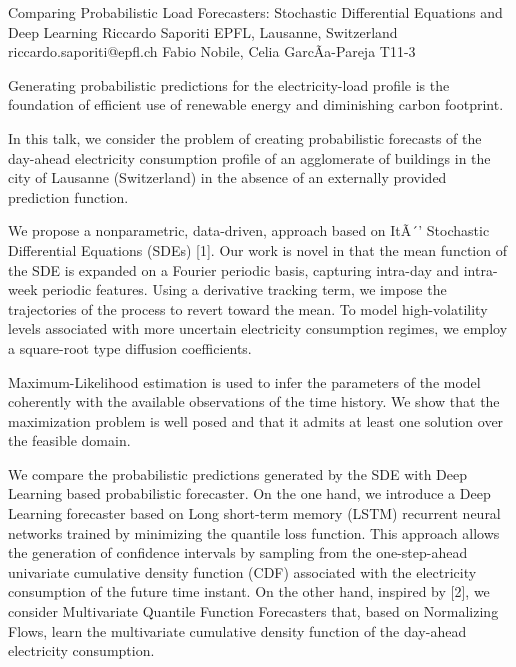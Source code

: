 \begin{talk}
  {Comparing Probabilistic Load Forecasters: Stochastic Differential Equations and Deep Learning}%
  {Riccardo Saporiti}%
  {EPFL, Lausanne, Switzerland}%
  {riccardo.saporiti@epfl.ch}%
  {Fabio Nobile, Celia GarcÃ­a-Pareja}%
  {T11-3}%

Generating probabilistic predictions for the electricity-load profile is the foundation of efficient use of renewable energy and diminishing carbon footprint.

In this talk, we consider the problem of creating probabilistic forecasts of the day-ahead electricity consumption profile of an agglomerate of buildings in the city of Lausanne (Switzerland) in the absence of an externally provided prediction function. 
 
We propose a nonparametric, data-driven, approach based on ItÃ´' Stochastic Differential Equations (SDEs) [1]. Our work is novel in that the mean function of the SDE is expanded on a Fourier periodic basis, capturing intra-day and intra-week periodic features. 
Using a derivative tracking term, we impose the trajectories of the process to revert toward the mean. To model high-volatility levels associated with more uncertain electricity consumption regimes, we employ a square-root type diffusion coefficients. 

Maximum-Likelihood estimation is used to infer the parameters of the model coherently with the available observations of the time history. We show that the maximization problem is well posed and that it admits at least one solution over the feasible domain. 

We compare the probabilistic predictions generated by the SDE with Deep Learning based probabilistic forecaster. 
On the one hand, we introduce a Deep Learning forecaster based on Long short-term memory (LSTM) recurrent neural networks trained by minimizing the quantile loss function. This approach allows the generation of confidence intervals by sampling from the one-step-ahead univariate cumulative density function (CDF) associated with the electricity consumption of the future time instant. 
On the other hand, inspired by [2], we consider Multivariate Quantile Function Forecasters that, based on Normalizing Flows, learn the multivariate cumulative density function of the day-ahead electricity consumption.


\end{talk}
